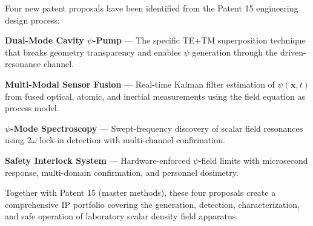 \documentclass[11pt,a4paper]{article}
\begin{document}
Four new patent proposals have been identified from the Patent 15
engineering design process:

\begin{tcolorbox}[colback=green!3, colframe=green!50!black,
title=New Patent Proposals Summary]
\begin{description}[nosep]
\item[Proposal A:] \textbf{Dual-Mode Cavity $\psi$-Pump} ---
The specific TE+TM superposition technique that breaks geometry
transparency and enables $\psi$ generation through the
driven-resonance channel.

\item[Proposal B:] \textbf{Multi-Modal Sensor Fusion} ---
Real-time Kalman filter estimation of $\psi(\mathbf{x},t)$
from fused optical, atomic, and inertial measurements using
the field equation as process model.

\item[Proposal C:] \textbf{$\psi$-Mode Spectroscopy} ---
Swept-frequency discovery of scalar field resonances using
$2\omega$ lock-in detection with multi-channel confirmation.

\item[Proposal D:] \textbf{Safety Interlock System} ---
Hardware-enforced $\psi$-field limits with microsecond
response, multi-domain confirmation, and personnel dosimetry.
\end{description}
\end{tcolorbox}

Together with Patent 15 (master methods), these four proposals
create a comprehensive IP portfolio covering the generation,
detection, characterization, and safe operation of laboratory
scalar density field apparatus.
\end{document}
